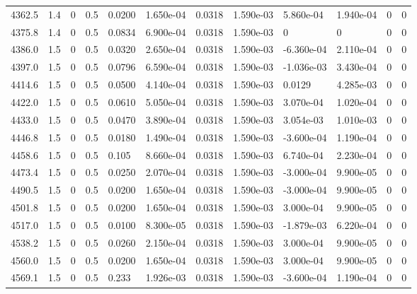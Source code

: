 \documentclass[preview]{standalone}
\begin{document}
{{{{{{{{{\begin{tabular}{L{1.2cm}C{1.2cm} C{0.3cm}C{0.5cm} C{1.4cm}C{1.4cm} C{1.4cm}C{1.4cm} C{1.6cm}C{1.6cm} C{1.6cm}C{1.6cm}}
  4362.5  &   1.4  & 0     & 0.5 &  0.0200  & 1.650e-04  &  0.0318&   1.590e-03& 5.860e-04 & 1.940e-04   &  0 & 0  \\ 
  4375.8  &   1.4  & 0     & 0.5 &  0.0834  & 6.900e-04  &  0.0318&   1.590e-03& 0 & 0   &  0 & 0  \\ 
  4386.0  &   1.5  & 0     & 0.5 &  0.0320  & 2.650e-04  &  0.0318&   1.590e-03& -6.360e-04 & 2.110e-04   &  0 & 0  \\ 
  4397.0  &   1.5  & 0     & 0.5 &  0.0796  & 6.590e-04  &  0.0318&   1.590e-03& -1.036e-03 & 3.430e-04   &  0 & 0  \\ 
  4414.6  &   1.5  & 0     & 0.5 &  0.0500  & 4.140e-04  &  0.0318&   1.590e-03& 0.0129 & 4.285e-03   &  0 & 0  \\ 
  4422.0  &   1.5  & 0     & 0.5 &  0.0610  & 5.050e-04  &  0.0318&   1.590e-03& 3.070e-04 & 1.020e-04   &  0 & 0  \\ 
  4433.0  &   1.5  & 0     & 0.5 &  0.0470  & 3.890e-04  &  0.0318&   1.590e-03& 3.054e-03 & 1.010e-03   &  0 & 0  \\ 
  4446.8  &   1.5  & 0     & 0.5 &  0.0180  & 1.490e-04  &  0.0318&   1.590e-03& -3.600e-04 & 1.190e-04   &  0 & 0  \\ 
  4458.6  &   1.5  & 0     & 0.5 &  0.105  & 8.660e-04  &  0.0318&   1.590e-03& 6.740e-04 & 2.230e-04   &  0 & 0  \\ 
  4473.4  &   1.5  & 0     & 0.5 &  0.0250  & 2.070e-04  &  0.0318&   1.590e-03& -3.000e-04 & 9.900e-05   &  0 & 0  \\ 
  4490.5  &   1.5  & 0     & 0.5 &  0.0200  & 1.650e-04  &  0.0318&   1.590e-03& -3.000e-04 & 9.900e-05   &  0 & 0  \\ 
  4501.8  &   1.5  & 0     & 0.5 &  0.0200  & 1.650e-04  &  0.0318&   1.590e-03& 3.000e-04 & 9.900e-05   &  0 & 0  \\ 
  4517.0  &   1.5  & 0     & 0.5 &  0.0100  & 8.300e-05  &  0.0318&   1.590e-03& -1.879e-03 & 6.220e-04   &  0 & 0  \\ 
  4538.2  &   1.5  & 0     & 0.5 &  0.0260  & 2.150e-04  &  0.0318&   1.590e-03& 3.000e-04 & 9.900e-05   &  0 & 0  \\ 
  4560.0  &   1.5  & 0     & 0.5 &  0.0200  & 1.650e-04  &  0.0318&   1.590e-03& 3.000e-04 & 9.900e-05   &  0 & 0  \\ 
  4569.1  &   1.5  & 0     & 0.5 &  0.233  & 1.926e-03  &  0.0318&   1.590e-03& -3.600e-04 & 1.190e-04   &  0 & 0  \\ 
\hline 
\end{tabular} 

}}}}}}}}}
\end{document}
